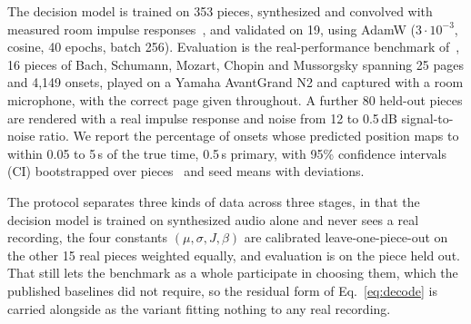 \documentclass{article}
\begin{document}
The decision model is trained on 353 pieces, synthesized and convolved with
measured room impulse responses~\cite{traer2016}, and validated on 19, using
AdamW ($3\cdot10^{-3}$, cosine, 40 epochs, batch 256). Evaluation is the
real-performance benchmark of~\cite{henkel2019rl}, 16 pieces of Bach, Schumann,
Mozart, Chopin and Mussorgsky spanning 25 pages and 4,149 onsets, played on a
Yamaha AvantGrand N2 and captured with a room microphone, with the correct page
given throughout. A further 80 held-out pieces are rendered with a real impulse
response and noise from 12 to 0.5\,dB signal-to-noise ratio. We report the percentage of onsets
whose predicted position maps to within 0.05 to 5\,s of the true time, 0.5\,s
primary, with 95\% confidence intervals (CI) bootstrapped over pieces~\cite{efron1993} and seed
means with deviations.

The protocol separates three kinds of data across three stages, in that the
decision model is trained on synthesized audio alone and never sees a real
recording, the four constants
$(\mu,\sigma,J,\beta)$ are calibrated leave-one-piece-out on the other 15 real
pieces weighted equally, and evaluation is on the piece held out. That still
lets the benchmark as a whole participate in choosing them, which the published
baselines did not require, so the residual form of Eq.~\ref{eq:decode} is
carried alongside as the variant fitting nothing to any real recording.
\end{document}
